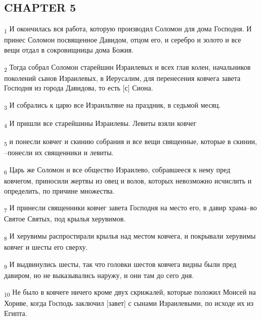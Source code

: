 \subsection{CHAPTER 5}
\begin{tcolorbox}
\textsubscript{1} И окончилась вся работа, которую производил Соломон для дома Господня. И принес Соломон посвященное Давидом, отцом его, и серебро и золото и все вещи отдал в сокровищницы дома Божия.
\end{tcolorbox}
\begin{tcolorbox}
\textsubscript{2} Тогда собрал Соломон старейшин Израилевых и всех глав колен, начальников поколений сынов Израилевых, в Иерусалим, для перенесения ковчега завета Господня из города Давидова, то есть [с] Сиона.
\end{tcolorbox}
\begin{tcolorbox}
\textsubscript{3} И собрались к царю все Израильтяне на праздник, в седьмой месяц.
\end{tcolorbox}
\begin{tcolorbox}
\textsubscript{4} И пришли все старейшины Израилевы. Левиты взяли ковчег
\end{tcolorbox}
\begin{tcolorbox}
\textsubscript{5} и понесли ковчег и скинию собрания и все вещи священные, которые в скинии, --понесли их священники и левиты.
\end{tcolorbox}
\begin{tcolorbox}
\textsubscript{6} Царь же Соломон и все общество Израилево, собравшееся к нему пред ковчегом, приносили жертвы из овец и волов, которых невозможно исчислить и определить, по причине множества.
\end{tcolorbox}
\begin{tcolorbox}
\textsubscript{7} И принесли священники ковчег завета Господня на место его, в давир храма--во Святое Святых, под крылья херувимов.
\end{tcolorbox}
\begin{tcolorbox}
\textsubscript{8} И херувимы распростирали крылья над местом ковчега, и покрывали херувимы ковчег и шесты его сверху.
\end{tcolorbox}
\begin{tcolorbox}
\textsubscript{9} И выдвинулись шесты, так что головки шестов ковчега видны были пред давиром, но не выказывались наружу, и они там до сего дня.
\end{tcolorbox}
\begin{tcolorbox}
\textsubscript{10} Не было в ковчеге ничего кроме двух скрижалей, которые положил Моисей на Хориве, когда Господь заключил [завет] с сынами Израилевыми, по исходе их из Египта.
\end{tcolorbox}
